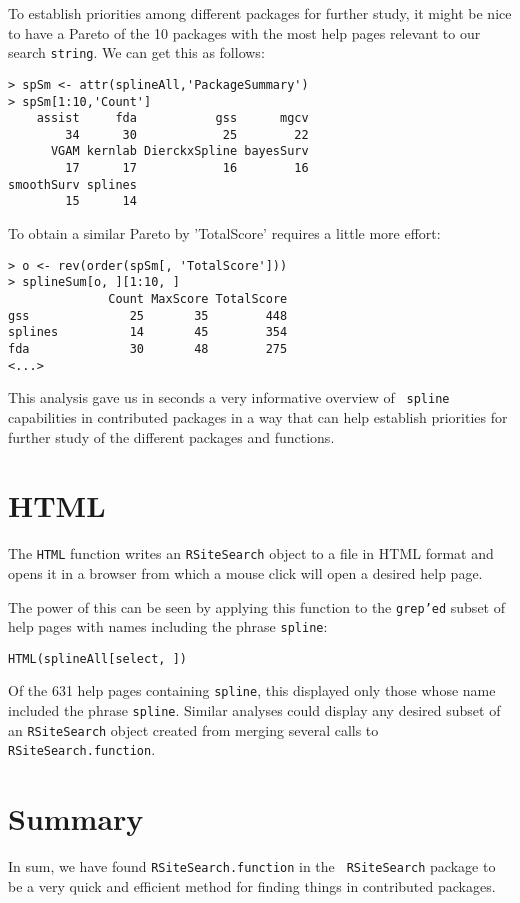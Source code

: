 To establish priorities among different packages for further study, it
might be nice to have a Pareto of the 10 packages with the most help
pages relevant to our search {\tt string}.  We can get this as
follows:
\begin{verbatim}
> spSm <- attr(splineAll,'PackageSummary')
> spSm[1:10,'Count']
    assist     fda           gss      mgcv
        34      30            25        22
      VGAM kernlab DierckxSpline bayesSurv
        17      17            16        16
smoothSurv splines
        15      14
\end{verbatim}
To obtain a similar Pareto by 'TotalScore' requires a little more
effort:
\begin{verbatim}
> o <- rev(order(spSm[, 'TotalScore']))
> splineSum[o, ][1:10, ]
              Count MaxScore TotalScore
gss              25       35        448
splines          14       45        354
fda              30       48        275
<...>
\end{verbatim}
This analysis gave us in seconds a very informative overview of {\tt
spline} capabilities in contributed \R{} packages in a way that can help
establish priorities for further study of the different packages and
functions.

\section*{HTML}
The {\tt HTML} function writes an {\tt RSiteSearch} object to a file
in HTML format and opens it in a browser from which a mouse click will
open a desired help page.

The power of this can be seen by applying this function to the
{\tt grep'ed} subset of help pages with names including the phrase
{\tt spline}:

\begin{verbatim}
HTML(splineAll[select, ])
\end{verbatim}

Of the 631 help pages containing {\tt spline}, this displayed only
those whose name included the phrase {\tt spline}.  Similar analyses
could display any desired subset of an {\tt RSiteSearch} object
created from merging several calls to {\tt RSiteSearch.function}.

\section*{Summary}
In sum, we have found {\tt RSiteSearch.function} in the {\tt
RSiteSearch} package to be a very quick and efficient method for
finding things in contributed packages.

